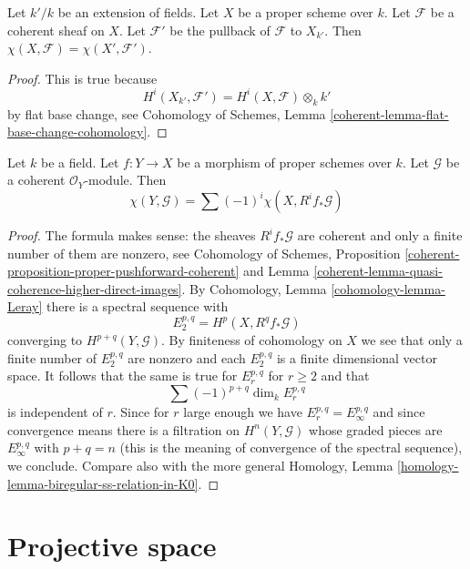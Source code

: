 \begin{lemma}
\label{lemma-euler-characteristic-extend-base-field}
Let $k'/k$ be an extension of fields. Let $X$ be a proper scheme
over $k$. Let $\mathcal{F}$ be a coherent sheaf on $X$.
Let $\mathcal{F}'$ be the pullback of $\mathcal{F}$ to $X_{k'}$.
Then $\chi(X, \mathcal{F}) = \chi(X', \mathcal{F}')$.
\end{lemma}

\begin{proof}
This is true because
$$
H^i(X_{k'}, \mathcal{F}') = H^i(X, \mathcal{F}) \otimes_k k'
$$
by flat base change, see
Cohomology of Schemes, Lemma \ref{coherent-lemma-flat-base-change-cohomology}.
\end{proof}

\begin{lemma}
\label{lemma-euler-characteristic-morphism}
Let $k$ be a field. Let $f : Y \to X$ be a morphism of proper schemes over
$k$. Let $\mathcal{G}$ be a coherent $\mathcal{O}_Y$-module. Then
$$
\chi(Y, \mathcal{G}) = \sum (-1)^i \chi(X, R^if_*\mathcal{G})
$$
\end{lemma}

\begin{proof}
The formula makes sense: the sheaves $R^if_*\mathcal{G}$ are coherent
and only a finite number of them are nonzero, see
Cohomology of Schemes,
Proposition \ref{coherent-proposition-proper-pushforward-coherent} and
Lemma \ref{coherent-lemma-quasi-coherence-higher-direct-images}.
By Cohomology, Lemma \ref{cohomology-lemma-Leray} there is a spectral
sequence with
$$
E_2^{p, q} = H^p(X, R^qf_*\mathcal{G})
$$
converging to $H^{p + q}(Y, \mathcal{G})$. By finiteness of cohomology
on $X$ we see that only a finite number of $E_2^{p, q}$ are nonzero
and each $E_2^{p, q}$ is a finite dimensional vector space. It follows
that the same is true for $E_r^{p, q}$ for $r \geq 2$ and that
$$
\sum (-1)^{p + q} \dim_k E_r^{p, q}
$$
is independent of $r$. Since for $r$ large enough we have
$E_r^{p, q} = E_\infty^{p, q}$ and since convergence means there
is a filtration on $H^n(Y, \mathcal{G})$ whose graded pieces are
$E_\infty^{p, q}$ with $p + q = n$ (this is the meaning of convergence
of the spectral sequence), we conclude.
Compare also with the more general
Homology, Lemma \ref{homology-lemma-biregular-ss-relation-in-K0}.
\end{proof}








\section{Projective space}
\label{section-projective-space}

